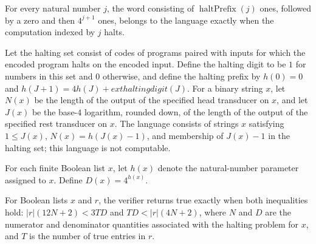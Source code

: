 \begin{theorem}
\label{Randomized.hlQuery_mem_iff}
\leanok
{}
For every natural number $j$, the word consisting of $\operatorname{haltPrefix}(j)$
ones, followed by a zero and then $4^{j+1}$ ones, belongs to the language exactly when
the computation indexed by $j$ halts.
\end{theorem}

\begin{theorem}
\label{Randomized.not_computablePred_haltLang}
\leanok
{}
Let the halting set consist of codes of programs paired with inputs for which the
encoded program halts on the encoded input. Define the halting digit to be $1$ for
numbers in this set and $0$ otherwise, and define the halting prefix by $h(0)=0$ and
$h(J+1)=4h(J)+	ext{halting digit}(J)$. For a binary string $x$, let $N(x)$ be the length
of the output of the specified head transducer on $x$, and let $J(x)$ be the base-$4$
logarithm, rounded down, of the length of the output of the specified rest transducer on
$x$. The language consists of strings $x$ satisfying $1\le J(x)$, $N(x)=h(J(x)-1)$, and
membership of $J(x)-1$ in the halting set; this language is not computable.
\end{theorem}

\begin{definition}
\label{Randomized.hlD}
\leanok
{}
For each finite Boolean list $x$, let $h(x)$ denote the natural-number parameter
assigned to $x$. Define $D(x)=4^{h(x)}$.
\end{definition}

\begin{definition}
\label{Randomized.haltCoinVerifier}
\leanok
{}
For Boolean lists $x$ and $r$, the verifier returns true exactly when both inequalities
hold: $|r|(12N+2)<3T D$ and $T D<|r|(4N+2)$, where $N$ and $D$ are the numerator and
denominator quantities associated with the halting problem for $x$, and $T$ is the
number of true entries in $r$.
\end{definition}


